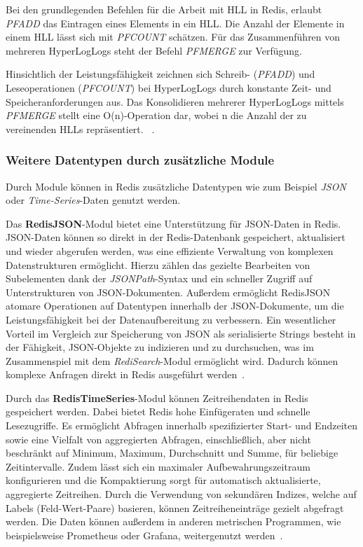 Bei den grundlegenden Befehlen für die Arbeit mit \ac{HLL} in Redis, erlaubt \emph{PFADD} das Eintragen eines Elements in ein \ac{HLL}. Die Anzahl der Elemente in einem \ac{HLL} lässt sich mit \emph{PFCOUNT} schätzen. Für das Zusammenführen von mehreren HyperLogLogs steht der Befehl \emph{PFMERGE} zur Verfügung.

Hinsichtlich der Leistungsfähigkeit zeichnen sich Schreib- (\emph{PFADD}) und Leseoperationen (\emph{PFCOUNT}) bei HyperLogLogs durch konstante Zeit- und Speicheranforderungen aus. Das Konsolidieren mehrerer HyperLogLogs mittels \emph{PFMERGE} stellt eine O(n)-Operation dar, wobei n die Anzahl der zu vereinenden HLLs repräsentiert.
~\cite{redis_ltd_hyperloglog_nodate}.


\subsubsection{Weitere Datentypen durch zusätzliche Module}
Durch Module können in Redis zusätzliche Datentypen wie zum Beispiel \emph{JSON} oder \emph{Time-Series}-Daten genutzt werden.

Das \textbf{RedisJSON}-Modul bietet eine Unterstützung für JSON-Daten in Redis.
JSON-Daten können so direkt in der Redis-Datenbank gespeichert, aktualisiert und wieder abgerufen werden, was eine effiziente Verwaltung von komplexen Datenstrukturen ermöglicht. Hierzu zählen das gezielte Bearbeiten von Subelementen dank der \emph{JSONPath}-Syntax und ein schneller Zugriff auf Unterstrukturen von JSON-Dokumenten.
Außerdem ermöglicht RedisJSON atomare Operationen auf Datentypen innerhalb der JSON-Dokumente, um die Leistungsfähigkeit bei der Datenaufbereitung zu verbessern.
Ein wesentlicher Vorteil im Vergleich zur Speicherung von JSON als serialisierte Strings besteht in der Fähigkeit, JSON-Objekte zu indizieren und zu durchsuchen, was im Zusammenspiel mit dem \emph{RediSearch}-Modul ermöglicht wird.
Dadurch können komplexe Anfragen direkt in Redis ausgeführt werden~\cite{redis_ltd_json_nodate, redis_ltd_json-use-cases_nodate}.

Durch das \textbf{RedisTimeSeries}-Modul können Zeitreihendaten in Redis gespeichert werden.
Dabei bietet Redis hohe Einfügeraten und schnelle Lesezugriffe.
Es ermöglicht Abfragen innerhalb spezifizierter Start- und Endzeiten sowie eine Vielfalt von aggregierten Abfragen, einschließlich, aber nicht beschränkt auf Minimum, Maximum, Durchschnitt und Summe, für beliebige Zeitintervalle.
Zudem lässt sich ein maximaler Aufbewahrungszeitraum konfigurieren und die Kompaktierung sorgt für automatisch aktualisierte, aggregierte Zeitreihen.
Durch die Verwendung von sekundären Indizes, welche auf Labels (Feld-Wert-Paare) basieren, können Zeitreiheneinträge gezielt abgefragt werden.
Die Daten können außerdem in anderen metrischen Programmen, wie beispielsweise Prometheus oder Grafana, weitergenutzt werden~\cite{redis_ltd_time_nodate}.


